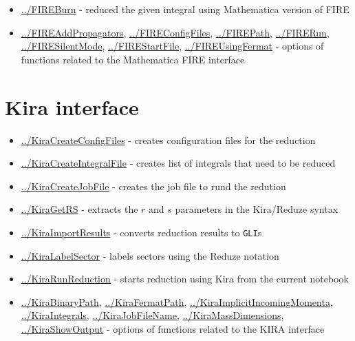 \documentclass[../FeynHelpersManual.tex]{subfiles}
\begin{document}
\begin{itemize}
\tightlist
\item
  \hyperlink{../fireburn}{../FIREBurn} - reduced the given integral
  using Mathematica version of FIRE
\item
  \hyperlink{../fireaddpropagators}{../FIREAddPropagators},
  \hyperlink{../fireconfigfiles}{../FIREConfigFiles},
  \hyperlink{../firepath}{../FIREPath},
  \hyperlink{../firerun}{../FIRERun},
  \hyperlink{../firesilentmode}{../FIRESilentMode},
  \hyperlink{../firestartfile}{../FIREStartFile},
  \hyperlink{../fireusingfermat}{../FIREUsingFermat} - options of
  functions related to the Mathematica FIRE interface
\end{itemize}

\hypertarget{kira interface}{
\section{Kira interface}\label{kira interface}}

\begin{itemize}
\tightlist
\item
  \hyperlink{../kiracreateconfigfiles}{../KiraCreateConfigFiles} -
  creates configuration files for the reduction
\item
  \hyperlink{../kiracreateintegralfile}{../KiraCreateIntegralFile} -
  creates list of integrals that need to be reduced
\item
  \hyperlink{../kiracreatejobfile}{../KiraCreateJobFile} - creates the
  job file to rund the redution
\item
  \hyperlink{../kiragetrs}{../KiraGetRS} - extracts the \(r\) and \(s\)
  parameters in the Kira/Reduze syntax
\item
  \hyperlink{../kiraimportresults}{../KiraImportResults} - converts
  reduction results to \texttt{GLI}s
\item
  \hyperlink{../kiralabelsector}{../KiraLabelSector} - labels sectors
  using the Reduze notation
\item
  \hyperlink{../kirarunreduction}{../KiraRunReduction} - starts
  reduction using Kira from the current notebook
\item
  \hyperlink{../kirabinarypath}{../KiraBinaryPath},
  \hyperlink{../kirafermatpath}{../KiraFermatPath},
  \hyperlink{../kiraimplicitincomingmomenta}{../KiraImplicitIncomingMomenta},
  \hyperlink{../kiraintegrals}{../KiraIntegrals},
  \hyperlink{../kirajobfilename}{../KiraJobFileName},
  \hyperlink{../kiramassdimensions}{../KiraMassDimensions},
  \hyperlink{../kirashowoutput}{../KiraShowOutput} - options of
  functions related to the KIRA interface
\end{itemize}
\end{document}
